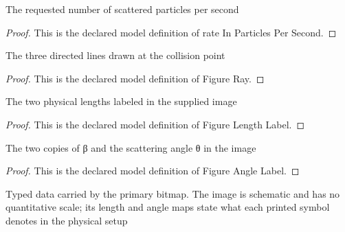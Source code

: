 \begin{definition}
  \label{def:physics:phyx-mini-0562:phyxminiproblems-problemphyxmini0562-rateinparticlespersecond}
  The requested number of scattered particles per second
\end{definition}
\begin{proof}
  This is the declared model definition of rate In Particles Per Second.
\end{proof}
\begin{definition}
  \label{def:physics:phyx-mini-0562:phyxminiproblems-problemphyxmini0562-figureray}
  The three directed lines drawn at the collision point
\end{definition}
\begin{proof}
  This is the declared model definition of Figure Ray.
\end{proof}
\begin{definition}
  \label{def:physics:phyx-mini-0562:phyxminiproblems-problemphyxmini0562-figurelengthlabel}
  The two physical lengths labeled in the supplied image
\end{definition}
\begin{proof}
  This is the declared model definition of Figure Length Label.
\end{proof}
\begin{definition}
  \label{def:physics:phyx-mini-0562:phyxminiproblems-problemphyxmini0562-figureanglelabel}
  The two copies of β and the scattering angle θ in the image
\end{definition}
\begin{proof}
  This is the declared model definition of Figure Angle Label.
\end{proof}
\begin{definition}
  \label{def:physics:phyx-mini-0562:phyxminiproblems-problemphyxmini0562-hardspherescatteringfigure}
  Typed data carried by the primary bitmap. The image is schematic and has no quantitative scale; its length and angle maps state what each printed symbol denotes in the physical setup
\end{definition}
